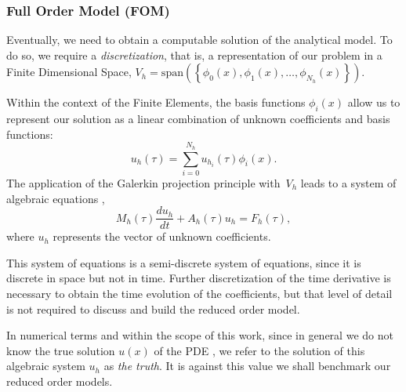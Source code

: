 \documentclass[../main.tex]{subfiles}
\begin{document}
\subsubsection{Full Order Model (FOM)}
Eventually, we need to obtain a computable solution of the analytical model. 
To do so, we require a \textit{discretization}, that is, a representation of our problem in a Finite
Dimensional Space, $V_h = \text{span}(\left\{\phi_0(x), \phi_1(x), \ldots, \phi_{N_h}(x)\right\})$.
 
Within the context of the Finite Elements, the basis functions $\phi_i(x)$ allow us to represent our solution as a linear combination of unknown coefficients and basis functions:
\begin{equation}
    u_h \left(\tau\right) = \sum^{N_h}_{i=0} u_{h_{i}} \left(\tau\right) \phi_i (x).
\end{equation}
The application of the Galerkin projection principle with~$V_h$ leads to a system of algebraic equations
,
\begin{equation}
    \label{eq:algebraic_system_fom}
    M_h (\tau) \frac{d u_h}{dt} + A_h (\tau) u_h  = F_h(\tau),
\end{equation}
where $u_h$ represents the vector of unknown coefficients.

This system of equations is a semi-discrete system of equations, since it is discrete in space but not in time. 
Further discretization of the time derivative is necessary to obtain the time evolution of the coefficients, but that level of detail is not required to discuss and build the reduced order model. 

In numerical terms and within the scope of this work, since in general we do not know the true solution $u(x)$ of the PDE
, we refer to the solution of this algebraic system $u_h$ as \textit{the truth}.
It is against this value we shall benchmark our reduced order models. 
\end{document}
